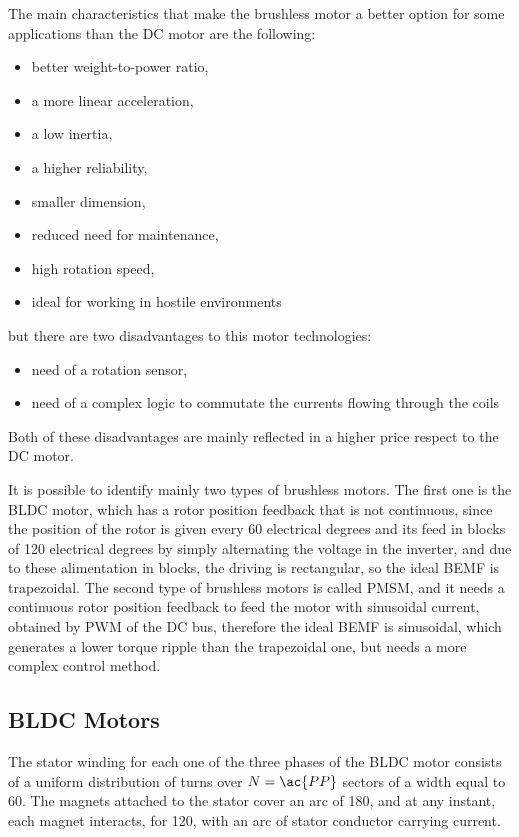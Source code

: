 The main characteristics that make the brushless motor a better option for some applications than the \ac{DC} motor are the following:

\begin{itemize}
	\item better weight-to-power ratio,
	\item a more linear acceleration,
	\item a low inertia,
	\item a higher reliability,
	\item smaller dimension,
	\item reduced need for maintenance,
	\item high rotation speed,
	\item ideal for working in hostile environments
\end{itemize}

but there are two disadvantages to this motor technologies: 

\begin{itemize}
	\item need of a rotation sensor,
	\item need of a complex logic to commutate the currents flowing through the coils
\end{itemize}

Both of these disadvantages are mainly reflected in a higher price respect to the \ac{DC} motor.

It is possible to identify mainly two types of brushless motors. The first one is the \acf{BLDC} motor, which has a rotor position feedback that is not continuous, since the position of the rotor is given every 60 electrical degrees and its feed in blocks of 120 electrical degrees by simply alternating the voltage in the inverter, and due to these alimentation in blocks, the driving is rectangular, so the ideal \ac{BEMF} is trapezoidal. The second type of brushless motors is called \acf{PMSM}, and it needs a continuous rotor position feedback to feed the motor with sinusoidal current, obtained by \acf{PWM} of the \ac{DC} bus, therefore the ideal \ac{BEMF} is sinusoidal, which generates a lower torque ripple than the trapezoidal one, but needs a more complex control method.

\subsection{BLDC Motors}

The stator winding for each one of the three phases of the \ac{BLDC} motor consists of a uniform distribution of turns over $N=\ac{PP}$ sectors of a width equal to 60\degree. The magnets attached to the stator cover an arc of 180\degree, and at any instant, each magnet interacts, for 120\degree, with an arc of stator conductor carrying current.

